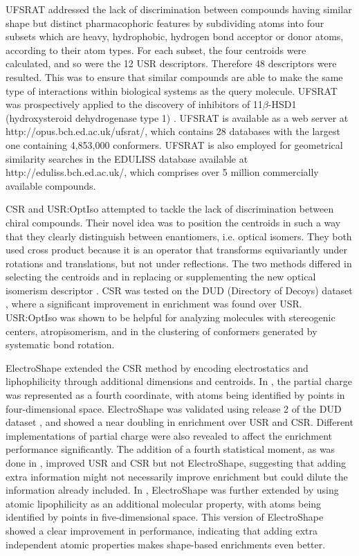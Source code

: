 \documentclass[a4,center,fleqn]{NAR}
\begin{document}
UFSRAT \cite{1436} addressed the lack of discrimination between compounds having similar shape but distinct pharmacophoric features by subdividing atoms into four subsets which are heavy, hydrophobic, hydrogen bond acceptor or donor atoms, according to their atom types. For each subset, the four centroids were calculated, and so were the 12 USR descriptors. Therefore 48 descriptors were resulted. This was to ensure that similar compounds are able to make the same type of interactions within biological systems as the query molecule. UFSRAT was prospectively applied to the discovery of inhibitors of 11$\beta$-HSD1 (hydroxysteroid dehydrogenase type 1) \cite{1505}. UFSRAT is available as a web server at http://opus.bch.ed.ac.uk/ufsrat/, which contains 28 databases with the largest one containing 4,853,000 conformers. UFSRAT is also employed for geometrical similarity searches in the EDULISS database \cite{1437} available at http://eduliss.bch.ed.ac.uk/, which comprises over 5 million commercially available compounds.

CSR \cite{1334} and USR:OptIso \cite{1335} attempted to tackle the lack of discrimination between chiral compounds. Their novel idea was to position the centroids in such a way that they clearly distinguish between enantiomers, i.e. optical isomers. They both used cross product because it is an operator that transforms equivariantly under rotations and translations, but not under reflections. The two methods differed in selecting the centroids and in replacing or supplementing the new optical isomerism descriptor \cite{1335}. CSR \cite{1334} was tested on the DUD (Directory of Decoys) dataset \cite{87}, where a significant improvement in enrichment was found over USR. USR:OptIso \cite{1335} was shown to be helpful for analyzing molecules with stereogenic centers, atropisomerism, and in the clustering of conformers generated by systematic bond rotation.

ElectroShape \cite{1337,1338} extended the CSR \cite{1334} method by encoding electrostatics and liphophilicity through additional dimensions and centroids. In \cite{1337}, the partial charge was represented as a fourth coordinate, with atoms being identified by points in four-dimensional space. ElectroShape was validated using release 2 of the DUD dataset \cite{87}, and showed a near doubling in enrichment over USR and CSR. Different implementations of partial charge were also revealed to affect the enrichment performance significantly. The addition of a fourth statistical moment, as was done in \cite{1333}, improved USR and CSR but not ElectroShape, suggesting that adding extra information might not necessarily improve enrichment but could dilute the information already included. In \cite{1338}, ElectroShape was further extended by using atomic lipophilicity as an additional molecular property, with atoms being identified by points in five-dimensional space. This version of ElectroShape showed a clear improvement in performance, indicating that adding extra independent atomic properties makes shape-based enrichments even better.
\end{document}
